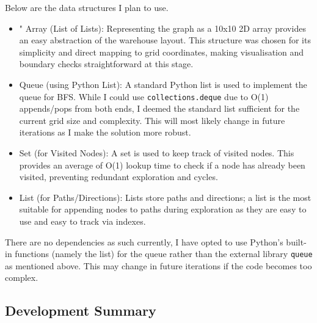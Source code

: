 Below are the data structures I plan to use.
\begin{itemize}
    \item " Array (List of Lists): Representing the graph as a 10x10 2D array provides an easy abstraction of the warehouse layout. This structure was chosen for its simplicity and direct mapping to grid coordinates, making visualisation and boundary checks straightforward at this stage.
    \item Queue (using Python List): A standard Python list is used to implement the queue for BFS. While I could use \verb|collections.deque| due to O(1) appends/pops from both ends, I deemed the standard list sufficient for the current grid size and complexity. This will most likely change in future iterations as I make the solution more robust.
    \item Set (for Visited Nodes): A set is used to keep track of visited nodes. This provides an average of O(1) lookup time to check if a node has already been visited, preventing redundant exploration and cycles.
    \item List (for Paths/Directions): Lists store paths and directions; a list is the most suitable for appending nodes to paths during exploration as they are easy to use and easy to track via indexes.

\end{itemize}

There are no dependencies as such currently, I have opted to use Python's built-in functions (namely the list) for the queue rather than the external library \verb|queue| as mentioned above. This may change in future iterations if the code becomes too complex.


\subsection{Development Summary}

